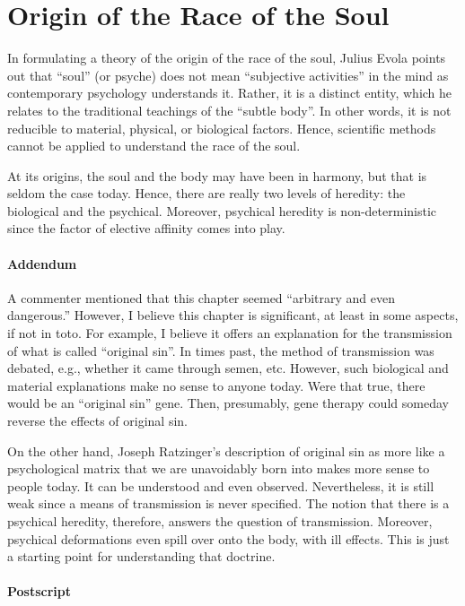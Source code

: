 \section{Origin of the Race of the Soul}

In formulating a theory of the origin of the race of the soul, Julius Evola points out that ``soul'' (or psyche) does not mean ``subjective activities'' in the mind as contemporary psychology understands it. Rather, it is a distinct entity, which he relates to the traditional teachings of the ``subtle body''. In other words, it is not reducible to material, physical, or biological factors. Hence, scientific methods cannot be applied to understand the race of the soul.

At its origins, the soul and the body may have been in harmony, but that is seldom the case today. Hence, there are really two levels of heredity: the biological and the psychical. Moreover, psychical heredity is non-deterministic since the factor of elective affinity comes into play.

\paragraph{Addendum}


A commenter mentioned that this chapter seemed ``arbitrary and even dangerous.'' However, I believe this chapter is significant, at least in some aspects, if not in toto. For example, I believe it offers an explanation for the transmission of what is called ``original sin''. In times past, the method of transmission was debated, e.g., whether it came through semen, etc. However, such biological and material explanations make no sense to anyone today. Were that true, there would be an ``original sin'' gene. Then, presumably, gene therapy could someday reverse the effects of original sin.

On the other hand, Joseph Ratzinger's description of original sin as more like a psychological matrix that we are unavoidably born into makes more sense to people today. It can be understood and even observed. Nevertheless, it is still weak since a means of transmission is never specified. The notion that there is a psychical heredity, therefore, answers the question of transmission. Moreover, psychical deformations even spill over onto the body, with ill effects. This is just a starting point for understanding that doctrine.

\paragraph{Postscript}


